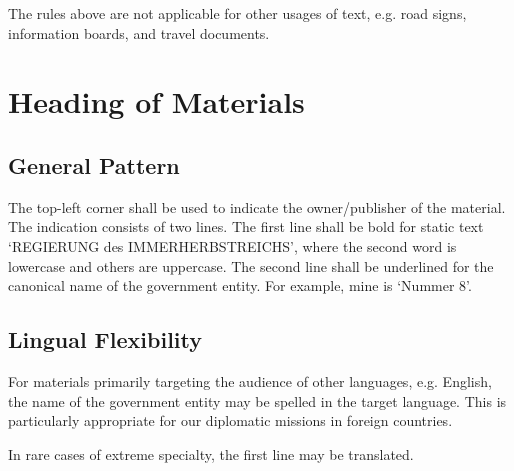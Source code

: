 The rules above are not applicable for other usages of text, e.g. road signs, information boards, and travel documents.



\section{Heading of Materials}

\subsection{General Pattern}

The top-left corner shall be used to indicate the owner/publisher of the material.
The indication consists of two lines.
The first line shall be bold for static text `\MakeUppercase{Regierung} des \MakeUppercase{Immerherbstreichs}',
where the second word is lowercase and others are uppercase.
The second line shall be underlined for the canonical name of the government entity.
For example, mine is `Nummer 8'.


\subsection{Lingual Flexibility}

For materials primarily targeting the audience of other languages, e.g. English,
the name of the government entity may be spelled in the target language.
This is particularly appropriate for our diplomatic missions in foreign countries.


In rare cases of extreme specialty, the first line may be translated.


